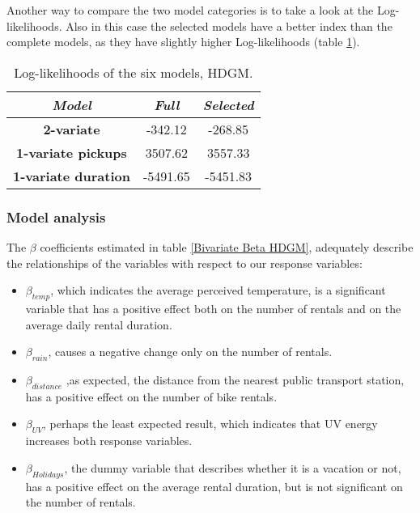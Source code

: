 \noindent
Another way to compare the two model categories is to take a look at the Log-likelihoods. Also in this case the selected models have a better index than the complete models, as they have slightly higher Log-likelihoods (table \ref{Log-likelihoods HDGM}). 

\begin{table}
	\centering
	\renewcommand\arraystretch{1.3}
	\begin{tabular}{c|c|c}
		\hline
		\textit{Model} &\textit{Full } & \textit{Selected} \\ 
		\hline
		\textbf{2-variate } & -342.12  & -268.85    \\ 
		\hline
		\textbf{1-variate pickups } & 3507.62  & 3557.33    \\ 
		\hline
		\textbf{1-variate duration} & -5491.65  & -5451.83   \\ 
		\hline
	\end{tabular}
	\caption[Log-likelihoods of the six models (HDGM)]{Log-likelihoods of the six models, HDGM.}
	\label{Log-likelihoods HDGM}
\end{table}

\subsubsection{Model analysis} 
The $\beta$ coefficients estimated in table \ref*{Bivariate Beta HDGM},
adequately describe the relationships of the variables with respect to our response variables:
\begin{itemize}
	\item $\beta_{temp}$, which indicates the average perceived temperature, is a significant variable that has a positive effect both on the number of rentals and on the average daily rental duration.
	\item $\beta_{rain}$, causes a negative change only on the number of rentals.
	\item $\beta_{distance}$ ,as expected, the distance from the nearest public transport station, has a positive effect on the number of bike rentals.
	\item $\beta_{UV}$, perhaps the least expected result, which indicates that UV energy increases both response variables.
	\item $\beta_{Holidays}$, the dummy variable that describes whether it is a vacation or not, has a positive effect on the average rental duration, but is not significant on the number of rentals.
\end{itemize}

